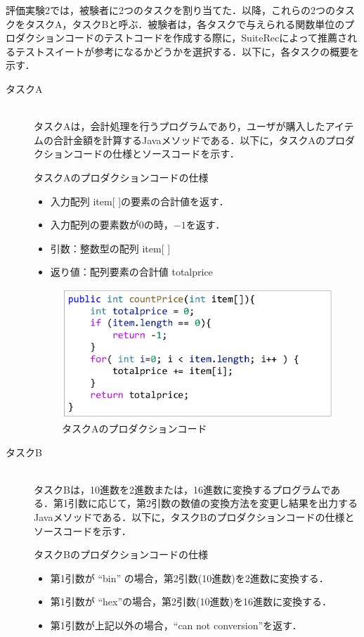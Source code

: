 \documentclass[12pt]{jarticle} %
\begin{document}
評価実験2では，被験者に2つのタスクを割り当てた．以降，これらの2つのタスクをタスクA，タスクBと呼ぶ．被験者は，各タスクで与えられる関数単位のプロダクションコードのテストコードを作成する際に，{\sf SuiteRec}によって推薦されるテストスイートが参考になるかどうかを選択する．以下に，各タスクの概要を示す．

\begin{description}
\item[タスクA]~\\
タスクAは，会計処理を行うプログラムであり，ユーザが購入したアイテムの合計金額を計算するJavaメソッドである．以下に，タスクAのプロダクションコードの仕様とソースコードを示す．
\begin{itembox}[l]{タスクAのプロダクションコードの仕様}
\begin{itemize}
\item 入力配列 item[ ]の要素の合計値を返す．
\item 入力配列の要素数が0の時，$-1$を返す．
\item 引数：整数型の配列 item[ ]
\item 返り値：配列要素の合計値 totalprice
\end{itemize}
\end{itembox}

\begin{figure}[htbp]
  \begin{center}
    \includegraphics[clip,width=12cm]{taskA.pdf}
    \caption{タスクAのプロダクションコード}
    \label{E1}
  \end{center}
\end{figure}

\item[タスクB]~\\
タスクBは，10進数を2進数または，16進数に変換するプログラムである．第1引数に応じて，第2引数の数値の変換方法を変更し結果を出力するJavaメソッドである．以下に，タスクBのプロダクションコードの仕様とソースコードを示す．


\begin{itembox}[l]{タスクBのプロダクションコードの仕様}
\begin{itemize}
\item 第1引数が ``bin'' の場合，第2引数(10進数)を2進数に変換する．
\item 第1引数が ``hex''の場合，第2引数(10進数)を16進数に変換する．
\item 第1引数が上記以外の場合，``can not conversion''を返す．
\end{itemize}
\end{itembox}


\end{description}
\end{document}
